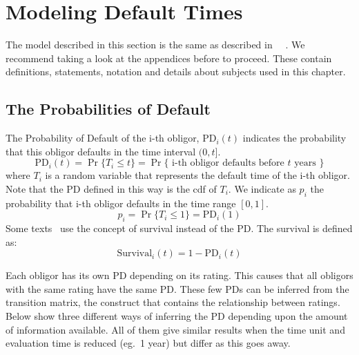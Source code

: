 \documentclass[11pt,fleqn]{book} %
\begin{document}


\chapter{Modeling Default Times}

The model described in this section is the same as described in 
~\cite{li:2000,roncalli:2001,frey:2001}~\cite[chap. 2.6]{bluhm:2002}.
We recommend taking a look at the appendices before to proceed.
These contain definitions, statements, notation and details about subjects 
used in this chapter.

\section{The Probabilities of Default}

\begin{definition}
	The Probability of Default of the i-th obligor, $\text{PD}_i(t)$
	indicates the probability that this obligor defaults in the time 
	interval $(0,t]$.
	\begin{displaymath}
		\text{PD}_i(t) = \Pr\{T_i \le t\} = 
		\Pr\{\text{ i-th obligor defaults before $t$ years }\}
	\end{displaymath}
	where $T_i$ is a random variable that represents the default
	time of the i-th obligor. Note that the PD defined in this way 
	is the cdf of $T_i$. We indicate as $p_i$ the probability that 
	i-th obligor defaults in the time range $[0,1]$.
	\begin{displaymath}
		p_i = \Pr\{T_i \le 1\} = \text{PD}_i(1) 
	\end{displaymath}
	Some texts~\cite{li:2000,roncalli:2001} use the concept of 
	survival instead of the PD\@. The survival is defined as:
	\begin{displaymath}
		\text{Survival}_i(t) = 1-\text{PD}_i(t)
	\end{displaymath}
\end{definition}

Each obligor has its own PD depending on its rating. This causes that 
all obligors with the same rating have the same PD\@. These few PDs can 
be inferred from the transition matrix, the construct that contains the 
relationship between ratings. 
Below show three different ways of inferring the PD depending 
upon the amount of information available. All of them give similar 
results when the time unit and evaluation time is reduced (eg.\ 1 year) 
but differ as this goes away.
\end{document}

